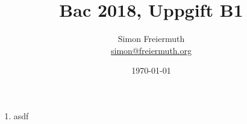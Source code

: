 \documentclass[12pt, letterpaper, twoside]{article}
\title{Bac 2018, Uppgift B1}
\author{Simon Freiermuth \\ \href{mailto:simon@freiermuth.org}{simon@freiermuth.org}}
\date{\today}
\begin{document}
\maketitle

\begin{flushleft}

\begin{enumerate}[label=\textbf{\alph*)}]

    \item
    asdf

\end{enumerate}

\end{flushleft}
\end{document}
